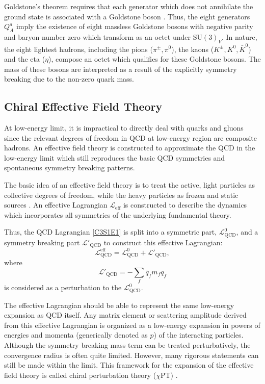 Goldstone's theorem requires that each generator which does not annihilate the ground state is associated with a Goldstone boson \cite{Goldstone1961, Goldstone1962}. Thus, the eight generators $Q_A^a$ imply the existence of eight massless Goldstone bosons with negative parity and baryon number zero which transform as an octet under $\mathrm{SU}(3)_V$. In nature, the eight lightest hadrons, including the pions ($\pi^\pm, \pi^0$), the kaons ($K^\pm, K^0, \bar{K}^0$) and the eta ($\eta$), compose an octet which qualifies for these Goldstone bosons. The mass of these bosons are interpreted as a result of the explicitly symmetry breaking due to the non-zero quark mass.

\subsection{Chiral Effective Field Theory}
\label{C3S1SS2}

At low-energy limit, it is impractical to directly deal with quarks and gluons since the relevant degrees of freedom in QCD at low-energy region are composite hadrons. An effective field theory is constructed to approximate the QCD in the low-energy limit which still reproduces the basic QCD symmetries and spontaneous symmetry breaking patterns.

The basic idea of an effective field theory is to treat the active, light particles as collective degrees of freedom, while the heavy particles as frozen and static sources \cite{Thomas2001}. An effective Lagrangian $\mathcal{L}_{\mathrm{eff}}$ is constructed to describe the dynamics which incorporates all symmetries of the underlying fundamental theory.

Thus, the QCD Lagrangian \cref{C3S1E1} is split into a symmetric part, $\mathcal{L}_{\mathrm{QCD}}^0$, and a symmetry breaking part $\mathcal{L}'_{\mathrm{QCD}}$ to construct this effective Lagrangian:
\begin{equation} \label{C3S1E4}
\mathcal{L}^{\mathrm{eff}}_{\mathrm{QCD}} = \mathcal{L}_{\mathrm{QCD}}^0+\mathcal{L}'_{\mathrm{QCD}},
\end{equation}
where
\begin{equation} \label{C3S1E5}
\mathcal{L}'_{\mathrm{QCD}} = -\sum_f\bar{q}_fm_fq_f
\end{equation}
is considered as a perturbation to the $\mathcal{L}_{\mathrm{QCD}}^0$.

The effective Lagrangian should be able to represent the same low-energy expansion as QCD itself. Any matrix element or scattering amplitude derived from this effective Lagrangian is organized as a low-energy expansion in powers of energies and momenta (generically denoted as $p$) of the interacting particles. Although the symmetry breaking mass term can be treated perturbatively, the convergence radius is often quite limited. However, many rigorous statements can still be made within the limit. This framework for the expansion of the effective field theory is called chiral perturbation theory ($\chi$PT) \cite{Weinberg1979}.

